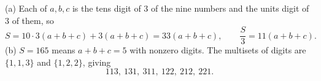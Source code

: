 (a) Each of $a,b,c$ is the tens digit of $3$ of the nine numbers and the units digit of $3$ of them, so
\[
S=10\cdot3(a+b+c)+3(a+b+c)=33(a+b+c),\qquad \dfrac {S}{3}=\boxed{11(a+b+c)}.
\]
(b) $S=165$ means $a+b+c=5$ with nonzero digits. The multisets of digits are $\{1,1,3\}$ and $\{1,2,2\}$, giving
\[
\boxed{113,\ 131,\ 311,\ 122,\ 212,\ 221}.
\]

